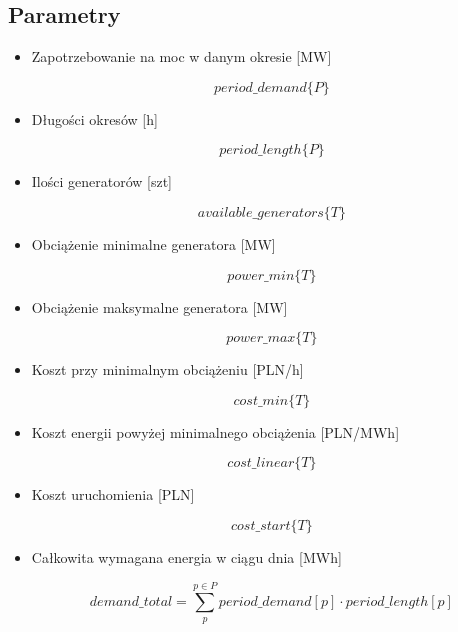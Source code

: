 \documentclass[12pt, twoside, hidelinks, a4paper]{article}
\begin{document}
\subsection{Parametry}
\begin{itemize}
\item Zapotrzebowanie na moc w danym okresie [MW]

$$period\_demand \{P\}$$
\item Długości okresów [h]

$$period\_length \{P\}$$
\item Ilości generatorów [szt]

$$available\_generators \{T\}$$
\item Obciążenie minimalne generatora [MW]

$$power\_min \{T\}$$
\item Obciążenie maksymalne generatora [MW]

$$power\_max \{T\}$$
\item Koszt przy minimalnym obciążeniu [PLN/h]

$$cost\_min \{T\}$$
\item Koszt energii powyżej minimalnego obciążenia [PLN/MWh]

$$cost\_linear \{T\}$$
\item Koszt uruchomienia [PLN]

$$cost\_start \{T\}$$
\item Całkowita wymagana energia w ciągu dnia [MWh]

$$demand\_total = \sum_{p}^{p \in P} period\_demand[p] \cdot period\_length[p]$$
\end{itemize}
\end{document}
